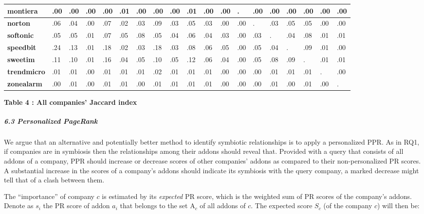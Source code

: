 \documentclass{article} %
\begin{document}
\begin{tabular}{|p{0.6in}|p{0.2in}|p{0.2in}|p{0.2in}|p{0.2in}|p{0.2in}|p{0.2in}|p{0.2in}|p{0.2in}|p{0.2in}|p{0.2in}|p{0.2in}|p{0.2in}|p{0.2in}|p{0.2in}|p{0.2in}|p{0.2in}|p{0.2in}|p{0.2in}|}
\textbf{montiera} & .00 & .00 & .00 & .00 & .01 & .00 & .00 & .00 & .01 & .00 & .00 & . & .00 & .00 & .00 & .00 & .00 & .00 \\ \hline 
\textbf{norton} & .06 & .04 & .00 & .07 & .02 & .03 & .09 & .03 & .05 & .03 & .00 & .00 & . & .03 & .05 & .05 & .00 & .00 \\ \hline 
\textbf{softonic} & .05 & .05 & .01 & .07 & .05 & .08 & .05 & .04 & .06 & .04 & .03 & .00 & .03 & . & .04 & .08 & .01 & .01 \\ \hline 
\textbf{speedbit} & .24 & .13 & .01 & .18 & .02 & .03 & .18 & .03 & .08 & .06 & .05 & .00 & .05 & .04 & . & .09 & .01 & .00 \\ \hline 
\textbf{sweetim} & .11 & .10 & .01 & .16 & .04 & .05 & .10 & .05 & .12 & .06 & .04 & .00 & .05 & .08 & .09 & . & .01 & .01 \\ \hline 
\textbf{trendmicro} & .01 & .01 & .00 & .01 & .01 & .01 & .02 & .01 & .01 & .01 & .00 & .00 & .00 & .01 & .01 & .01 & . & .00 \\ \hline 
\textbf{zonealarm} & .00 & .01 & .00 & .01 & .01 & .00 & .01 & .01 & .01 & .01 & .00 & .00 & .00 & .01 & .00 & .01 & .00 & . \\ \hline 
\end{tabular}

\textbf{Table 4 : All companies' Jaccard index}

  










\subparagraph{6.3  Personalized PageRank}

We argue that an alternative and potentially better method to identify symbiotic relationships is to apply a personalized PPR. As in RQ1, if companies are in symbiosis then the relationships among their addons should reveal that. Provided with a query that consists of all addons of a company, PPR should increase or decrease scores of other companies' addons as compared to their non-personalized PR scores. A substantial increase in the scores of a company's addons should indicate its symbiosis with the query company, a marked decrease might tell that of a clash between them.

The ``importance'' of company $c$ is estimated by its \textit{expected} PR score, which is the weighted sum of PR scores of the company's addons. Denote as $s_i$ the PR score of addon $a_i$ that belongs to the set ${\boldsymbol{\mathrm{A}}}_c$ of all addons of $c$. The expected score $S_c$ (of the company $c$) will then be: 
\end{document}
